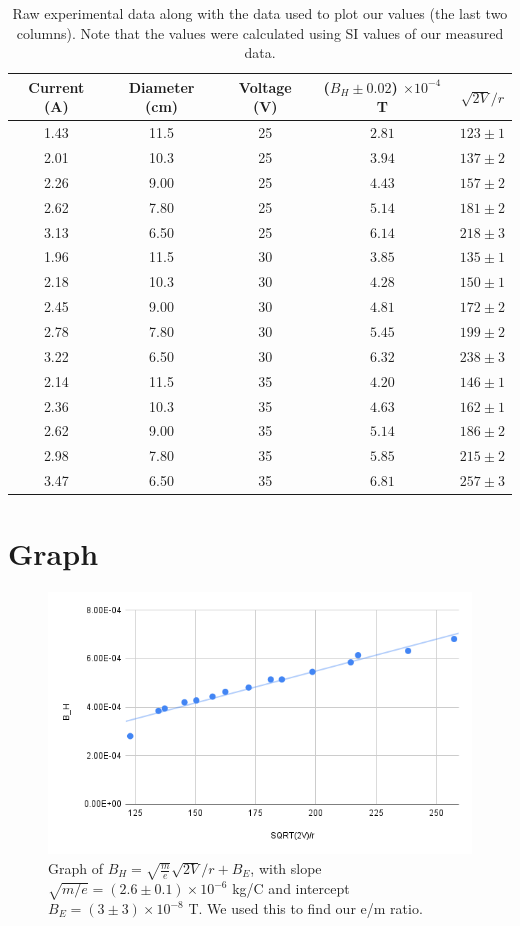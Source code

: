 \documentclass[12pt]{article}
\begin{document}
\begin{table}[h]\centering
    \caption{Raw experimental data along with the data used to plot our values (the last two columns). Note that the values were calculated using SI values of our measured data.}
    \begin{tabular}{c c c c c} \toprule
        Current (A) & Diameter (cm) & Voltage (V) & ($B_H \pm 0.02$) $\times 10^{-4}$ T & $\sqrt{2V}/r$ \\ \midrule
        1.43 & 11.5 & 25 & $2.81$ & $123 \pm 1$ \\
        2.01 & 10.3 & 25 & $3.94$ & $137 \pm 2$ \\
        2.26 & 9.00 & 25 & $4.43$ & $157 \pm 2$ \\
        2.62 & 7.80 & 25 & $5.14$ & $181 \pm 2$ \\
        3.13 & 6.50 & 25 & $6.14$ & $218 \pm 3$ \\
        1.96 & 11.5 & 30 & $3.85$ & $135 \pm 1$ \\
        2.18 & 10.3 & 30 & $4.28$ & $150 \pm 1$ \\
        2.45 & 9.00 & 30 & $4.81$ & $172 \pm 2$ \\
        2.78 & 7.80 & 30 & $5.45$ & $199 \pm 2$ \\
        3.22 & 6.50 & 30 & $6.32$ & $238 \pm 3$ \\
        2.14 & 11.5 & 35 & $4.20$ & $146 \pm 1$ \\
        2.36 & 10.3 & 35 & $4.63$ & $162 \pm 1$ \\
        2.62 & 9.00 & 35 & $5.14$ & $186 \pm 2$ \\
        2.98 & 7.80 & 35 & $5.85$ & $215 \pm 2$ \\
        3.47 & 6.50 & 35 & $6.81$ & $257 \pm 3$ \\ \bottomrule
    \end{tabular}
\end{table}

\section{Graph}
\begin{figure}[H]
    \centering
    \includegraphics[width=\textwidth]{chart.png}
    \caption{Graph of $B_H = \sqrt{\frac{m}{e}}\sqrt{2V}/r + B_E$, with slope $\sqrt{m/e} = (2.6 \pm 0.1) \times 10^{-6}$ kg/C and intercept $B_E = (3 \pm 3) \times 10^{-8}$ T.
        We used this to find our e/m ratio.}
    \label{fig:bh_vs_sqrt2v_r}
\end{figure}
\end{document}
